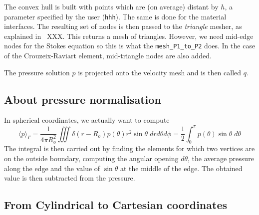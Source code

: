 The convex hull is built with points which are (on average) distant by $h$, 
a parameter specified by the user ({\tt hhh}).
The same is done for the material interfaces. 
The resulting set of nodes is then passed to the {\sl triangle} mesher, as explained 
in \stone~XXX.
This returns a mesh of triangles. However, we need mid-edge nodes for the Stokes equation
so this is what the {\tt mesh\_P1\_to\_P2} does. In the case of the Crouzeix-Raviart element, 
mid-triangle nodes are also added. 


The pressure solution $p$ is projected onto the velocity mesh and is then called $q$.





\subsection*{About pressure normalisation}

In spherical coordinates, we actually want to compute 
\[
\langle p \rangle _\Gamma = 
\frac{1}{4\pi R_o^2} \iiint \delta(r-R_o) p(\theta) r^2 \sin\theta \; dr d\theta d\phi 
= \frac{1}{2} \int_0^\pi p(\theta) \sin\theta \; d\theta
\]
The integral is then carried out by finding the elements for which 
two vertices are on the outside boundary, 
computing the angular opening $d\theta$, the average pressure 
along the edge and the value of $\sin\theta$ at the
middle of the edge. 
The obtained value is then subtracted from the pressure. 

\subsection*{From Cylindrical to Cartesian coordinates}










